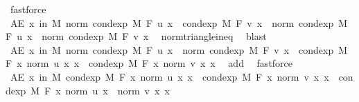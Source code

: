 \begin{isabellebody}
\ fastforce\isanewline
\ \ \isamarkupfalse%
\ \isamarkupfalse%
\ {\isachardoublequoteopen}AE\ x\ in\ M{\isachardot}{\kern0pt}\ norm\ {\isacharparenleft}{\kern0pt}cond{\isacharunderscore}{\kern0pt}exp\ M\ F\ u\ x\ {\isacharplus}{\kern0pt}\ cond{\isacharunderscore}{\kern0pt}exp\ M\ F\ v\ x{\isacharparenright}{\kern0pt}\ {\isasymle}\ norm\ {\isacharparenleft}{\kern0pt}cond{\isacharunderscore}{\kern0pt}exp\ M\ F\ u\ x{\isacharparenright}{\kern0pt}\ {\isacharplus}{\kern0pt}\ norm\ {\isacharparenleft}{\kern0pt}cond{\isacharunderscore}{\kern0pt}exp\ M\ F\ v\ x{\isacharparenright}{\kern0pt}{\isachardoublequoteclose}\ \isamarkupfalse%
\ norm{\isacharunderscore}{\kern0pt}triangle{\isacharunderscore}{\kern0pt}ineq\ \isamarkupfalse%
\ blast\isanewline
\ \ \isamarkupfalse%
\ \isamarkupfalse%
\ {\isachardoublequoteopen}AE\ x\ in\ M{\isachardot}{\kern0pt}\ norm\ {\isacharparenleft}{\kern0pt}cond{\isacharunderscore}{\kern0pt}exp\ M\ F\ u\ x{\isacharparenright}{\kern0pt}\ {\isacharplus}{\kern0pt}\ norm\ {\isacharparenleft}{\kern0pt}cond{\isacharunderscore}{\kern0pt}exp\ M\ F\ v\ x{\isacharparenright}{\kern0pt}\ {\isasymle}\ cond{\isacharunderscore}{\kern0pt}exp\ M\ F\ {\isacharparenleft}{\kern0pt}{\isasymlambda}x{\isachardot}{\kern0pt}\ norm\ {\isacharparenleft}{\kern0pt}u\ x{\isacharparenright}{\kern0pt}{\isacharparenright}{\kern0pt}\ x\ {\isacharplus}{\kern0pt}\ cond{\isacharunderscore}{\kern0pt}exp\ M\ F\ {\isacharparenleft}{\kern0pt}{\isasymlambda}x{\isachardot}{\kern0pt}\ norm\ {\isacharparenleft}{\kern0pt}v\ x{\isacharparenright}{\kern0pt}{\isacharparenright}{\kern0pt}\ x{\isachardoublequoteclose}\ \isamarkupfalse%
\ add{\isacharparenleft}{\kern0pt}{}{\isacharcomma}{\kern0pt}{}{\isacharparenright}{\kern0pt}\ \isamarkupfalse%
\ fastforce\isanewline
\ \ \isamarkupfalse%
\ \isamarkupfalse%
\ {\isachardoublequoteopen}AE\ x\ in\ M{\isachardot}{\kern0pt}\ cond{\isacharunderscore}{\kern0pt}exp\ M\ F\ {\isacharparenleft}{\kern0pt}{\isasymlambda}x{\isachardot}{\kern0pt}\ norm\ {\isacharparenleft}{\kern0pt}u\ x{\isacharparenright}{\kern0pt}{\isacharparenright}{\kern0pt}\ x\ {\isacharplus}{\kern0pt}\ cond{\isacharunderscore}{\kern0pt}exp\ M\ F\ {\isacharparenleft}{\kern0pt}{\isasymlambda}x{\isachardot}{\kern0pt}\ norm\ {\isacharparenleft}{\kern0pt}v\ x{\isacharparenright}{\kern0pt}{\isacharparenright}{\kern0pt}\ x\ {\isacharequal}{\kern0pt}\ cond{\isacharunderscore}{\kern0pt}exp\ M\ F\ {\isacharparenleft}{\kern0pt}{\isasymlambda}x{\isachardot}{\kern0pt}\ norm\ {\isacharparenleft}{\kern0pt}u\ x{\isacharparenright}{\kern0pt}\ {\isacharplus}{\kern0pt}\ norm\ {\isacharparenleft}{\kern0pt}v\ x{\isacharparenright}{\kern0pt}{\isacharparenright}{\kern0pt}\ x{\isachardoublequoteclose}\ \isamarkupfalse%

\end{isabellebody}
